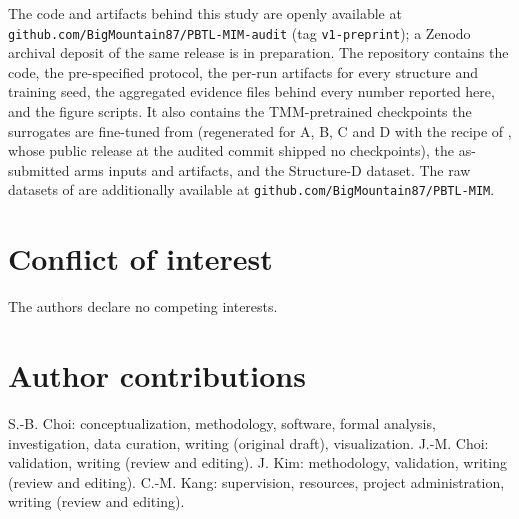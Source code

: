 \documentclass[11pt,a4paper]{article}
\begin{document}
The code and artifacts behind this study are openly available at
\texttt{github.\allowbreak{}com/\allowbreak{}BigMountain87/\allowbreak{}PBTL-\allowbreak{}MIM-\allowbreak{}audit} (tag \texttt{v1-preprint}); a Zenodo archival deposit of
the same release is in preparation. The repository contains the code, the pre-specified protocol,
the per-run artifacts for every structure and training seed, the aggregated evidence
files behind every number reported here, and the figure scripts. It also contains the
TMM-pretrained checkpoints the surrogates are fine-tuned from (regenerated for A, B, C
and D with the recipe of \cite{choi20261}, whose public release at the audited commit shipped no checkpoints), the as-submitted
arm\textquotesingle s inputs and artifacts, and the Structure-D dataset. The raw datasets of \cite{choi20261} are
additionally available at \texttt{github.\allowbreak{}com/\allowbreak{}BigMountain87/\allowbreak{}PBTL-\allowbreak{}MIM}.

\section*{Conflict of interest}

The authors declare no competing interests.

\section*{Author contributions}

S.-B. Choi: conceptualization, methodology, software, formal analysis, investigation, data
curation, writing (original draft), visualization. J.-M. Choi: validation, writing (review
and editing). J. Kim: methodology, validation, writing (review and editing). C.-M. Kang: supervision, resources, project administration, writing (review and
editing).
\end{document}

